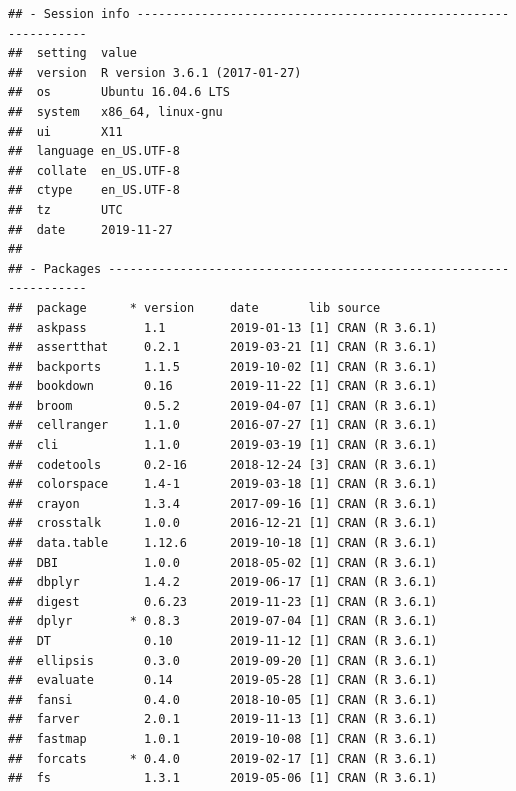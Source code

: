 \documentclass[]{book}
\begin{document}
\begin{verbatim}
## - Session info ---------------------------------------------------------------
##  setting  value                       
##  version  R version 3.6.1 (2017-01-27)
##  os       Ubuntu 16.04.6 LTS          
##  system   x86_64, linux-gnu           
##  ui       X11                         
##  language en_US.UTF-8                 
##  collate  en_US.UTF-8                 
##  ctype    en_US.UTF-8                 
##  tz       UTC                         
##  date     2019-11-27                  
## 
## - Packages -------------------------------------------------------------------
##  package      * version     date       lib source                           
##  askpass        1.1         2019-01-13 [1] CRAN (R 3.6.1)                   
##  assertthat     0.2.1       2019-03-21 [1] CRAN (R 3.6.1)                   
##  backports      1.1.5       2019-10-02 [1] CRAN (R 3.6.1)                   
##  bookdown       0.16        2019-11-22 [1] CRAN (R 3.6.1)                   
##  broom          0.5.2       2019-04-07 [1] CRAN (R 3.6.1)                   
##  cellranger     1.1.0       2016-07-27 [1] CRAN (R 3.6.1)                   
##  cli            1.1.0       2019-03-19 [1] CRAN (R 3.6.1)                   
##  codetools      0.2-16      2018-12-24 [3] CRAN (R 3.6.1)                   
##  colorspace     1.4-1       2019-03-18 [1] CRAN (R 3.6.1)                   
##  crayon         1.3.4       2017-09-16 [1] CRAN (R 3.6.1)                   
##  crosstalk      1.0.0       2016-12-21 [1] CRAN (R 3.6.1)                   
##  data.table     1.12.6      2019-10-18 [1] CRAN (R 3.6.1)                   
##  DBI            1.0.0       2018-05-02 [1] CRAN (R 3.6.1)                   
##  dbplyr         1.4.2       2019-06-17 [1] CRAN (R 3.6.1)                   
##  digest         0.6.23      2019-11-23 [1] CRAN (R 3.6.1)                   
##  dplyr        * 0.8.3       2019-07-04 [1] CRAN (R 3.6.1)                   
##  DT             0.10        2019-11-12 [1] CRAN (R 3.6.1)                   
##  ellipsis       0.3.0       2019-09-20 [1] CRAN (R 3.6.1)                   
##  evaluate       0.14        2019-05-28 [1] CRAN (R 3.6.1)                   
##  fansi          0.4.0       2018-10-05 [1] CRAN (R 3.6.1)                   
##  farver         2.0.1       2019-11-13 [1] CRAN (R 3.6.1)                   
##  fastmap        1.0.1       2019-10-08 [1] CRAN (R 3.6.1)                   
##  forcats      * 0.4.0       2019-02-17 [1] CRAN (R 3.6.1)                   
##  fs             1.3.1       2019-05-06 [1] CRAN (R 3.6.1)                   

\end{verbatim}
\end{document}
